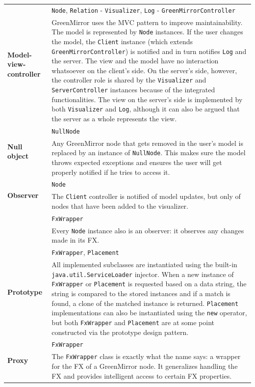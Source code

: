 \begin{longtable}{ |l p{10cm}| }
\hline\multirow{2}{*}{\textbf{Model-view-controller}}
   & \texttt{Node}, \texttt{Relation} - \texttt{Visualizer}, \texttt{Log} - \texttt{GreenMirrorController} \\* & GreenMirror uses the MVC pattern to improve maintainability. The model is represented by \texttt{Node} instances. If the user changes the model, the \texttt{Client} instance (which extends \texttt{GreenMirrorController}) is notified and in turn notifies \texttt{Log} and the server. The view and the model have no interaction whatsoever on the client's side. On the server's side, however, the controller role is shared by the \texttt{Visualizer} and \texttt{ServerController} instances because of the integrated functionalities. The view on the server's side is implemented by both \texttt{Visualizer} and \texttt{Log}, although it can also be argued that the server as a whole represents the view. \\
\hline\multirow{2}{*}{\textbf{Null object}}
   & \texttt{NullNode} \\* & Any GreenMirror node that gets removed in the user's model is replaced by an instance of \texttt{NullNode}. This makes sure the model throws expected exceptions and ensures the user will get properly notified if he tries to access it. \\
\hline\multirow{2}{*}{\textbf{Observer}}
   & \texttt{Node} \\* & The \texttt{Client} controller is notified of model updates, but only of nodes that have been added to the visualizer. \\
   & \texttt{FxWrapper} \\* & Every \texttt{Node} instance also is an observer: it observes any changes made in its FX. \\
\hline\multirow{2}{*}{\textbf{Prototype}}
   & \texttt{FxWrapper}, \texttt{Placement} \\* & All implemented subclasses are instantiated using the built-in \texttt{java.util.ServiceLoader} injector. When a new instance of \texttt{FxWrapper} or \texttt{Placement} is requested based on a data string, the string is compared to the stored instances and if a match is found, a clone of the matched instance is returned. \texttt{Placement} implementations can also be instantiated using the \texttt{new} operator, but both \texttt{FxWrapper} and \texttt{Placement} are at some point constructed via the prototype design pattern. \\
\hline\multirow{2}{*}{\textbf{Proxy}}
   & \texttt{FxWrapper} \\* & The \texttt{FxWrapper} class is exactly what the name says: a wrapper for the FX of a GreenMirror node. It generalizes handling the FX and provides intelligent access to certain FX properties. \\

\end{longtable}
